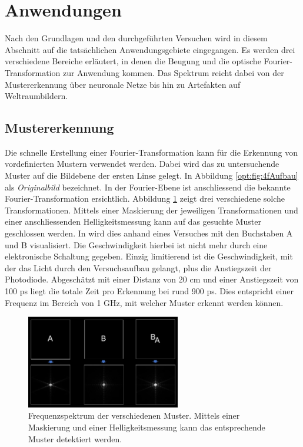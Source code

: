 %
%
%
%
\section{Anwendungen}
\label{opt:section:anwendungen}

Nach den Grundlagen und den durchgeführten Versuchen wird in diesem Abschnitt auf die tatsächlichen Anwendungsgebiete eingegangen.
Es werden drei verschiedene Bereiche erläutert, in denen die Beugung und die optische Fourier-Transformation zur Anwendung kommen.
Das Spektrum reicht dabei von der Mustererkennung über neuronale Netze bis hin zu Artefakten auf Weltraumbildern.

\subsection{Mustererkennung}
Die schnelle Erstellung einer Fourier-Transformation kann für die Erkennung von vordefinierten Mustern verwendet werden.
Dabei wird das zu untersuchende Muster auf die Bildebene der ersten Linse gelegt. 
In Abbildung \ref{opt:fig:4fAufbau} als \emph{Originalbild} bezeichnet.
In der Fourier-Ebene ist anschliessend die bekannte Fourier-Transformation ersichtlich.
Abbildung \ref{opt:fig:patternYT} zeigt drei verschiedene solche Transformationen.
Mittels einer Maskierung der jeweiligen Transformationen und einer anschliessenden Helligkeitsmessung kann auf das gesuchte Muster geschlossen werden.
In \cite{opt:YT:PatternRecognition} wird dies anhand eines Versuches mit den Buchstaben A und B visualisiert.
Die Geschwindigkeit hierbei ist nicht mehr durch eine elektronische Schaltung gegeben.
Einzig limitierend ist die Geschwindigkeit, mit der das Licht durch den Versuchsaufbau gelangt, plus die Anstiegszeit der Photodiode.
Abgeschätzt mit einer Distanz von 20 cm und einer Anstiegszeit von 100 ps liegt die totale Zeit pro Erkennung bei rund 900 ps.
Dies entspricht einer Frequenz im Bereich von 1 GHz, mit welcher Muster erkennt werden können.

\begin{figure}
    \centering
    \includegraphics[width=0.6\textwidth]{papers/opt/images/pattern_YT.png}
    \caption{Frequenzspektrum der verschiedenen Muster. 
    Mittels einer Maskierung und einer Helligkeitsmessung kann das entsprechende Muster detektiert werden.}
    \label{opt:fig:patternYT}
\end{figure}


